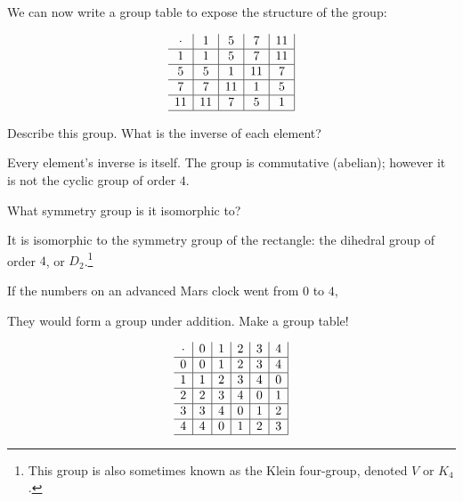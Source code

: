 \documentclass[../key.tex]{subfiles}
\begin{document}
We can now write a group table to expose the structure of the group:

$$\begin{array}{c|c|c|c|c|}
\cdot & 1 & 5 & 7 & 11 \\ \hline
1 & 1 & 5 & 7 & 11 \\ \hline
5 & 5 & 1 & 11 & 7 \\ \hline
7 & 7 & 11 & 1 & 5 \\ \hline
11 & 11 & 7 & 5 & 1 \\ \hline
\end{array}$$

\begin{inner_problem}
\item Describe this group. What is the inverse of each element?
\end{inner_problem}

Every element's inverse is itself. The group is commutative (abelian); however it is not the cyclic group of order $4$.

\begin{inner_problem}
\item What symmetry group is it isomorphic to?
\end{inner_problem}

It is isomorphic to the symmetry group of the rectangle: the dihedral group of order $4$, or $D_2$.\footnote{This group is also sometimes known as the Klein four-group, denoted $V$ or $K_4$.}

\begin{outer_problem}
\item If the numbers on an advanced Mars clock went from $0$ to $4$,
\end{outer_problem}

\begin{inner_problem}[start=1]
\item They would form a group under addition. Make a group table!
\end{inner_problem}

$$\begin{array}{c|c|c|c|c|c|}
\cdot & 0 & 1 & 2 & 3 & 4 \\ \hline
0 & 0 & 1 & 2 & 3 & 4 \\ \hline
1 & 1 & 2 & 3 & 4 & 0 \\ \hline
2 & 2 & 3 & 4 & 0 & 1 \\ \hline
3 & 3 & 4 & 0 & 1 & 2 \\ \hline
4 & 4 & 0 & 1 & 2 & 3 \\ \hline
\end{array}$$
\end{document}
